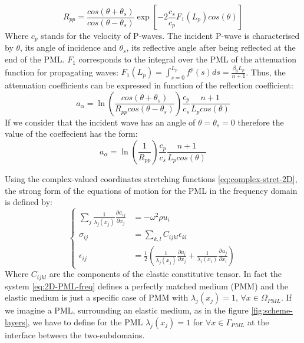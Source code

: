 \begin{equation}
R_{pp} = \frac{cos(\theta+\theta_s)}{cos(\theta-\theta_s)} \exp\left[-2\frac{c_s}{c_p}F_1(L_p)cos(\theta)\right]
\label{eq:Rpp} 
\end{equation} 
Where $c_p$ stands for the velocity of P-waves. The incident P-wave is characterised by $\theta$, its angle of incidence and $\theta_s$, its reflective angle after being reflected at the end of the PML. $F_1$ corresponds to the integral over the PML of the attenuation function for propagating waves: $F_1(L_p) = \int_{s=0}^{L_p} f^p(s) ds = \frac{\beta_0 L_p}{n+1}$. Thus, the attenuation coefficients can be expressed in function of the reflection coefficient:
\begin{equation}
a_\alpha = \ln\left(\frac{cos(\theta+\theta_s)}{R_{pp}cos(\theta-\theta_s)} \right) \frac{c_p}{c_s} \frac{n+1}{L_p cos(\theta)}
\label{eq:alpha_kucu}
\end{equation} 
If we consider that the incident wave has an angle of $\theta = \theta_s = 0$ therefore the value of the coeffecient has the form:
\begin{equation}
a_\alpha = \ln\left(\frac{1}{R_{pp}} \right) \frac{c_p}{c_s} \frac{n+1}{L_p cos(\theta)}
\end{equation}
\par Using the complex-valued coordinates stretching functions \ref{eq:complex-stret-2D}, the strong form of the equations of motion for the PML in the frequency domain is defined by:
\begin{equation}
\begin{cases}
\sum_{j} \frac{1}{\lambda_j(x_j)} \frac{\partial \sigma_{ij}}{\partial x_j} & = - \omega^2 \rho u_i \\
\sigma_{ij} &= \sum_{k,l} C_{ijkl} \epsilon_{kl} \\
\epsilon_{ij} &= \frac{1}{2} \left(\frac{1}{\lambda_j(x_j)} \frac{\partial u_{i}}{\partial x_j} + \frac{1}{\lambda_i(x_i)} \frac{\partial u_{j}}{\partial x_i} \right)
\end{cases}
\label{eq:2D-PML-freq}
\end{equation} 
Where $C_{ijkl}$ are the components of the elastic constitutive tensor. In fact the system \ref{eq:2D-PML-freq} defines a perfectly matched medium (PMM) and the elastic medium is just a specific case of PMM with $\lambda_j(x_j) = 1$, $\forall x \in \Omega_{PML}$. If we imagine a PML, surrounding an elastic medium, as in the figure \ref{fig:scheme-layers}, we have to define for the PML $\lambda_j(x_j) = 1$ for $\forall x \in \Gamma_{PML}$ at the interface between the two-subdomains. \\
